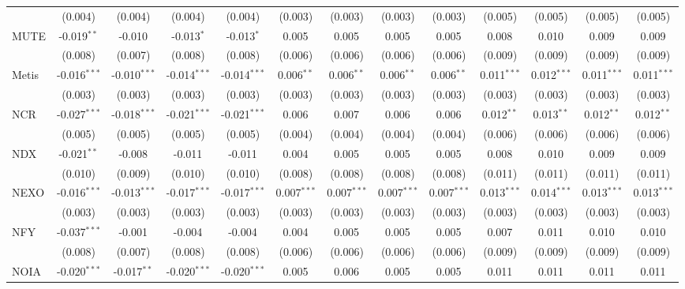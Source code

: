 \begin{table}[!htbp]
\begin{tabular}{@{\extracolsep{5pt}}lcccccccccccc}
  & (0.004) & (0.004) & (0.004) & (0.004) & (0.003) & (0.003) & (0.003) & (0.003) & (0.005) & (0.005) & (0.005) & (0.005) \\
 MUTE & -0.019$^{**}$ & -0.010$^{}$ & -0.013$^{*}$ & -0.013$^{*}$ & 0.005$^{}$ & 0.005$^{}$ & 0.005$^{}$ & 0.005$^{}$ & 0.008$^{}$ & 0.010$^{}$ & 0.009$^{}$ & 0.009$^{}$ \\
  & (0.008) & (0.007) & (0.008) & (0.008) & (0.006) & (0.006) & (0.006) & (0.006) & (0.009) & (0.009) & (0.009) & (0.009) \\
 Metis & -0.016$^{***}$ & -0.010$^{***}$ & -0.014$^{***}$ & -0.014$^{***}$ & 0.006$^{**}$ & 0.006$^{**}$ & 0.006$^{**}$ & 0.006$^{**}$ & 0.011$^{***}$ & 0.012$^{***}$ & 0.011$^{***}$ & 0.011$^{***}$ \\
  & (0.003) & (0.003) & (0.003) & (0.003) & (0.003) & (0.003) & (0.003) & (0.003) & (0.003) & (0.003) & (0.003) & (0.003) \\
 NCR & -0.027$^{***}$ & -0.018$^{***}$ & -0.021$^{***}$ & -0.021$^{***}$ & 0.006$^{}$ & 0.007$^{}$ & 0.006$^{}$ & 0.006$^{}$ & 0.012$^{**}$ & 0.013$^{**}$ & 0.012$^{**}$ & 0.012$^{**}$ \\
  & (0.005) & (0.005) & (0.005) & (0.005) & (0.004) & (0.004) & (0.004) & (0.004) & (0.006) & (0.006) & (0.006) & (0.006) \\
 NDX & -0.021$^{**}$ & -0.008$^{}$ & -0.011$^{}$ & -0.011$^{}$ & 0.004$^{}$ & 0.005$^{}$ & 0.005$^{}$ & 0.005$^{}$ & 0.008$^{}$ & 0.010$^{}$ & 0.009$^{}$ & 0.009$^{}$ \\
  & (0.010) & (0.009) & (0.010) & (0.010) & (0.008) & (0.008) & (0.008) & (0.008) & (0.011) & (0.011) & (0.011) & (0.011) \\
 NEXO & -0.016$^{***}$ & -0.013$^{***}$ & -0.017$^{***}$ & -0.017$^{***}$ & 0.007$^{***}$ & 0.007$^{***}$ & 0.007$^{***}$ & 0.007$^{***}$ & 0.013$^{***}$ & 0.014$^{***}$ & 0.013$^{***}$ & 0.013$^{***}$ \\
  & (0.003) & (0.003) & (0.003) & (0.003) & (0.003) & (0.003) & (0.003) & (0.003) & (0.003) & (0.003) & (0.003) & (0.003) \\
 NFY & -0.037$^{***}$ & -0.001$^{}$ & -0.004$^{}$ & -0.004$^{}$ & 0.004$^{}$ & 0.005$^{}$ & 0.005$^{}$ & 0.005$^{}$ & 0.007$^{}$ & 0.011$^{}$ & 0.010$^{}$ & 0.010$^{}$ \\
  & (0.008) & (0.007) & (0.008) & (0.008) & (0.006) & (0.006) & (0.006) & (0.006) & (0.009) & (0.009) & (0.009) & (0.009) \\
 NOIA & -0.020$^{***}$ & -0.017$^{**}$ & -0.020$^{***}$ & -0.020$^{***}$ & 0.005$^{}$ & 0.006$^{}$ & 0.005$^{}$ & 0.005$^{}$ & 0.011$^{}$ & 0.011$^{}$ & 0.011$^{}$ & 0.011$^{}$ \\

\end{tabular}
\end{table}
